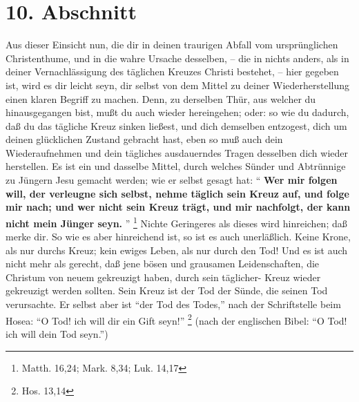 \section{10. Abschnitt}

Aus dieser Einsicht nun, die dir in deinen traurigen Abfall vom ursprünglichen Christenthume, und in die wahre Ursache desselben, -- die in nichts anders, als in deiner Vernachlässigung des täglichen Kreuzes Christi bestehet, -- hier gegeben ist, wird es dir leicht seyn, dir selbst von dem Mittel zu deiner Wiederherstellung einen klaren Begriff zu machen. Denn, zu derselben Thür, aus welcher du hinausgegangen bist, mußt du auch wieder hereingehen; oder: so wie du dadurch, daß du das tägliche Kreuz sinken ließest, und dich demselben entzogest, dich um deinen glücklichen Zustand gebracht hast, eben so muß auch dein Wiederaufnehmen und dein tägliches ausdauerndes Tragen desselben dich wieder herstellen. Es ist ein und dasselbe Mittel, durch welches Sünder und Abtrünnige zu Jüngern Jesu gemacht werden; wie er selbst gesagt hat: "` \textbf{Wer mir folgen will, der verleugne sich selbst, nehme täglich sein Kreuz auf, und folge mir nach; und wer nicht sein Kreuz trägt, und mir nachfolgt, der kann nicht mein Jünger seyn.} "' \footnote{Matth. 16,24; Mark. 8,34; Luk. 14,17} Nichte Geringeres als dieses wird hinreichen; daß merke dir. So wie es aber hinreichend ist, so ist es auch unerläßlich. Keine Krone, als nur durchs Kreuz; kein ewiges Leben, als nur durch den Tod! Und es ist auch nicht mehr als gerecht, daß jene bösen und grausamen Leidenschaften, die Christum von neuem gekreuzigt haben, durch sein täglicher- Kreuz wieder gekreuzigt werden sollten. Sein Kreuz ist der Tod der Sünde, die seinen Tod verursachte. Er selbst aber ist "`der Tod des Todes,"' nach der Schriftstelle beim Hosea: "`O Tod! ich will dir ein Gift seyn!"' \footnote{Hos. 13,14} (nach der englischen Bibel: "`O Tod! ich will dein Tod seyn."')

